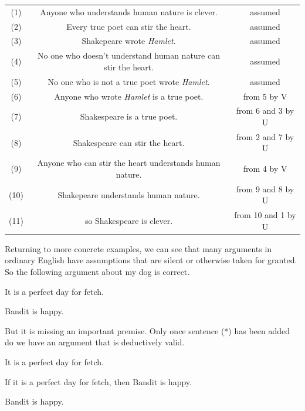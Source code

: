 \begin{center}
  \begin{tabular}{c c c}
    (1) & Anyone who understands human nature is clever. & assumed \\
    (2) & Every true poet can stir the heart. & assumed \\
    (3) & Shakepeare wrote \emph{Hamlet}. & assumed \\
    (4) & No one who doesn't understand human nature can stir the heart. &
    assumed\\
    (5) & No one who is not a true poet wrote \emph{Hamlet}. & assumed \\
    (6) & Anyone who wrote \emph{Hamlet} is a true poet. & from 5 by V \\
    (7) & Shakespeare is a true poet. & from 6 and 3 by U \\
    (8) & Shakespeare can stir the heart. & from 2 and 7 by U \\
    (9) & Anyone who can stir the heart understands human nature. &
    from 4 by V \\
    (10) & Shakepeare understands human nature. & from 9 and 8 by U \\
    (11) & so Shakespeare is clever. & from 10 and 1 by U \\
  \end{tabular}
\end{center}

Returning to more concrete examples, we can see that many arguments in ordinary
English have assumptions that are silent or otherwise taken for granted. So the
following argument about my dog is correct.

\begin{argument}
\item[ ]          It is a perfect day for fetch.
\item[\therefore] Bandit is happy.
\end{argument}

But it is missing an important premise. Only once sentence (*) has been added
do we have an argument that is deductively valid.

\begin{argument}
\item[ ]          It is a perfect day for fetch.
\item[(*)]        If it is a perfect day for fetch, then Bandit is happy.
\item[\therefore] Bandit is happy.
\end{argument}

